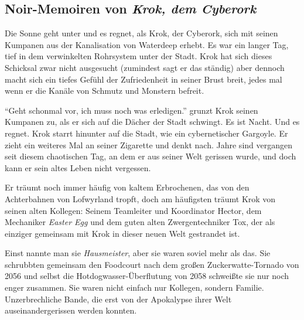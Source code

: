 \documentclass[final]{multiversum}
\begin{document}
\makemultititle
%




\subsection{Noir-Memoiren von \emph{Krok, dem Cyberork}}

Die Sonne geht unter und es regnet, als Krok, der Cyberork, sich mit seinen
Kumpanen aus der Kanalisation von Waterdeep erhebt. Es war ein langer Tag, tief
in dem verwinkelten Rohrsystem unter der Stadt. Krok hat sich dieses Schicksal
zwar nicht ausgesucht (zumindest sagt er das ständig) aber dennoch macht sich
ein tiefes Gefühl der Zufriedenheit in seiner Brust breit, jedes mal wenn er die
Kanäle von Schmutz und Monstern befreit.

\enquote{Geht schonmal vor, ich muss noch was erledigen.} grunzt Krok seinen
Kumpanen zu, als er sich auf die Dächer der Stadt schwingt. Es ist Nacht. Und es
regnet.  Krok starrt hinunter auf die Stadt, wie ein cybernetischer Gargoyle.
Er zieht ein weiteres Mal an seiner Zigarette und denkt nach. Jahre sind
vergangen seit diesem chaotischen Tag, an dem er aus seiner Welt gerissen wurde,
und doch kann er sein altes Leben nicht vergessen.

Er träumt noch immer häufig von kaltem Erbrochenen, das von den Achterbahnen von
Lofwyrland tropft, doch am häufigsten träumt Krok von seinen alten Kollegen:
Seinem Teamleiter und Koordinator Hector, dem Mechaniker \emph{Easter Egg} und
dem guten alten Zwergentechniker Tox, der als einziger gemeinsam mit Krok in
dieser neuen Welt gestrandet ist.

Einst nannte man sie \emph{Hausmeister}, aber sie waren soviel mehr als das. Sie
schrubbten gemeinsam den Foodcourt nach dem großen Zuckerwatte-Tornado von 2056
und selbst die Hotdogwasser-Überflutung von 2058 schweißte sie nur noch enger
zusammen. Sie waren nicht einfach nur Kollegen, sondern Familie. Unzerbrechliche
Bande, die erst von der Apokalypse ihrer Welt auseinandergerissen werden
konnten.
\end{document}
